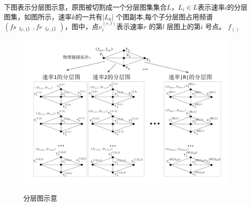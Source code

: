 下图表示分层图示意，原图被切割成一个分层图集集合$L$，$L_i \in L$表示速率$i$的分层图集，如图所示，速率$k$的一共有$|L_k|$ 个图副本,每个子分层图占用频谱$(fs_{（r,1）},fe_{（r,1）})$，图中，点$v_i^{(r,l)}$表示速率$r$ 的第$l$ 层图上的第$i$ 号点。
$f_{()}$
\begin{figure}
\setlength{\belowcaptionskip}{-0.5cm}
  \begin{center}
    {\includegraphics[width=1 \textwidth]{figures/LAYER.pdf}}
    \end{center}
  \caption{{\footnotesize{分层图示意}}}
  \label{layer}
\end{figure}
